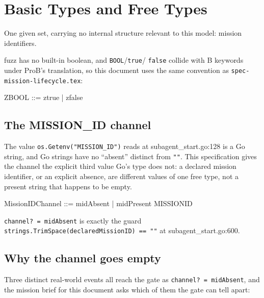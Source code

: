 \documentclass[a4paper,10pt,fleqn]{article}
\newcommand{\fpath}[1]{\texttt{#1}}
\newcommand{\field}[1]{\texttt{#1}}
\begin{document}
\section{Basic Types and Free Types}
\label{sec:basic}

One given set, carrying no internal structure relevant to this
model: mission identifiers.

\begin{zed}
[MISSIONID]
\end{zed}

fuzz has no built-in boolean, and \field{BOOL}/\field{true}/
\field{false} collide with B keywords under ProB's translation, so
this document uses the same convention as
\fpath{spec-mission-lifecycle.tex}:

\begin{zed}
ZBOOL ::= ztrue | zfalse
\end{zed}

\subsection{The MISSION\_ID channel}
\label{sec:channel}

The value \field{os.Getenv("MISSION\_ID")} reads at
subagent\_start.go:128 is a Go string, and Go strings have no
``absent'' distinct from \field{""}. This specification gives the
channel the explicit third value Go's type does not: a declared
mission identifier, or an explicit absence, are different values of
one free type, not a present string that happens to be empty.

\begin{zed}
MissionIDChannel ::= midAbsent | midPresent \ldata MISSIONID \rdata
\end{zed}

\field{channel? = midAbsent} is exactly the guard
\field{strings.TrimSpace(declaredMissionID) == ""} at
subagent\_start.go:600.

\subsection{Why the channel goes empty}
\label{sec:causes}

Three distinct real-world events all reach the gate as
\field{channel? = midAbsent}, and the mission brief for this
document asks which of them the gate can tell apart:
\end{document}

